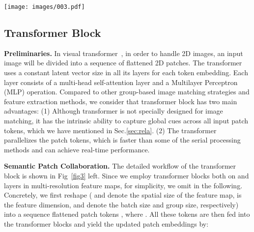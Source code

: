 \documentclass[journal]{IEEEtran}
\begin{document}
\begin{figure*}
		\begin{center}
			\centering
			\texttt{[image: images/003.pdf]}
		\end{center}
\caption{\textbf{Detailed illustration of the transformer block and the intra-MLP learning module}. Left: A group of images  are reshaped into patches. The transformer encoder will output the enhanced patch embeddings implemented by the multi-head MLP. We then reshape all the patches into image-like feature maps. Right: For each query image feature patch, it will match with its top- potentially corresponding patches. Then, it will be updated by aggregating different sub-region representations using MLP operation.}
		\label{fig3}
\end{figure*}

\subsection{Transformer Block}
\label{TS}

\noindent \textbf{Preliminaries.}
In visual transformer~\cite{dosovitskiy2020image}, in order to handle 2D images, an input image will be divided into a sequence of flattened 2D patches. The transformer uses a constant latent vector size  in all its layers for each token embedding. Each layer consists of a multi-head self-attention layer and a Multilayer Perceptron (MLP) operation. Compared to other group-based image matching strategies and feature extraction methods, we consider that transformer block has two main advantages: (1) 
Although transformer is not specially designed for image matching, it has the intrinsic ability to capture global cues across all input patch tokens, which we have mentioned in Sec.\ref{sec:rela}. (2) The transformer parallelizes the patch tokens, which is faster than some of the serial processing methods and can achieve real-time performance.


\vspace{1ex}

\noindent \textbf{Semantic Patch Collaboration.}
\label{spc}
The detailed workflow of the transformer block is shown in Fig~\ref{fig3} left. Since we employ transformer blocks both on  and  layers in multi-resolution feature maps, for simplicity, we omit  in the following. Concretely, we first reshape  ( and  denote the spatial size of the feature map,  is the feature dimension,  and  denote the batch size and group size, respectively) into a sequence flattened patch tokens , where . All these tokens are then fed into the transformer blocks and yield the updated patch embeddings  by: 
\end{document}
